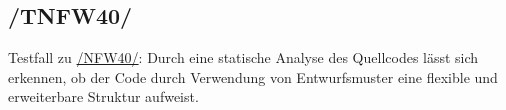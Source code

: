 \subsection*{/TNFW40/}

\label{/TNFW40/} Testfall zu \hyperref[/NFW40/]{/NFW40/}: Durch eine \gls{statische Analyse} des \Gls{Quellcode}s lässt sich erkennen, ob der Code durch Verwendung von \Gls{Entwurfsmuster} eine flexible und erweiterbare Struktur aufweist.
